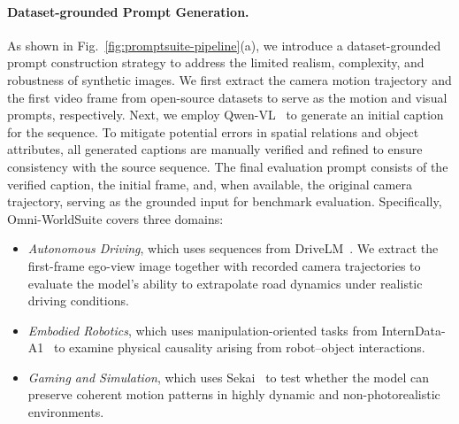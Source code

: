 \paragraph{Dataset-grounded Prompt Generation.} As shown in Fig.~\ref{fig:promptsuite-pipeline}(a), we introduce a dataset-grounded prompt construction strategy to address the limited realism, complexity, and robustness of synthetic images. We first extract the camera motion trajectory and the first video frame from open-source datasets to serve as the motion and visual prompts, respectively. Next, we employ Qwen-VL~\cite{Qwen3-VL} to generate an initial caption for the sequence. To mitigate potential errors in spatial relations and object attributes, all generated captions are manually verified and refined to ensure consistency with the source sequence. The final evaluation prompt consists of the verified caption, the initial frame, and, when available, the original camera trajectory, serving as the grounded input for benchmark evaluation. Specifically, Omni-WorldSuite covers three domains: 
\begin{itemize}
    \item \textit{Autonomous Driving}, which uses sequences from DriveLM~\cite{sima2024drivelm}. We extract the first-frame ego-view image together with recorded camera trajectories to evaluate the model's ability to extrapolate road dynamics under realistic driving conditions. 
    \item \textit{Embodied Robotics}, which uses manipulation-oriented tasks from InternData-A1~\cite{cai2026internvla} to examine physical causality arising from robot--object interactions. 
    \item \textit{Gaming and Simulation}, which uses Sekai~\cite{li2025sekai} to test whether the model can preserve coherent motion patterns in highly dynamic and non-photorealistic environments. 
\end{itemize}



